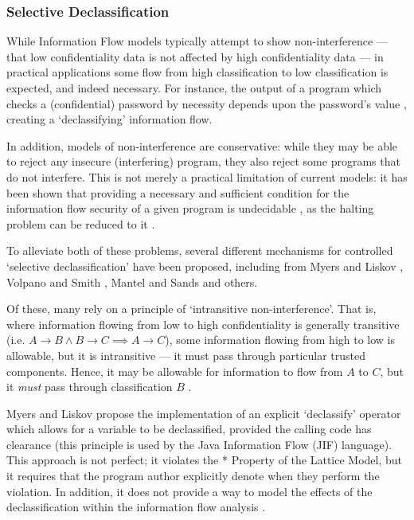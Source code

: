 \subsubsection{Selective Declassification}

While Information Flow models typically attempt to show non-interference --- that low confidentiality data is not affected by high confidentiality data --- in practical applications some flow from high classification to low classification is expected, and indeed necessary. For instance, the output of a program which checks a (confidential) password by necessity depends upon the password's value \cite{sabelfeld2003if}, creating a `declassifying' information flow.

In addition, models of non-interference are conservative: while they may be able to reject any insecure (interfering) program, they also reject some programs that do not interfere. This is not merely a practical limitation of current models: it has been shown that providing a necessary and sufficient condition for the information flow security of a given program is undecidable \cite{landi1992undecidability}, as the halting problem can be reduced to it \cite{denning1977if}.

To alleviate both of these problems, several different mechanisms for controlled `selective declassification' have been proposed, including from Myers and Liskov \cite{myers1997if}, Volpano and Smith \cite{volpano2000declassification}, Mantel and Sands \cite{mantel2004controlled} and others.

Of these, many rely on a principle of `intransitive non-interference'. That is, where information flowing from low to high confidentiality is generally transitive (i.e. $ A \rightarrow B \wedge B \rightarrow C \implies A \rightarrow C $), some information flowing from high to low is allowable, but it is intransitive --- it must pass through particular trusted components. Hence, it may be allowable for information to flow from $ A $ to $ C $, but it \textit{must} pass through classification $ B $ \cite{roscoe1999intransitive}.

Myers and Liskov \cite{myers1997if} propose the implementation of an explicit `declassify' operator which allows for a variable to be declassified, provided the calling code has clearance (this principle is used by the Java Information Flow (JIF) language). This approach is not perfect; it violates the * Property of the Lattice Model, but it requires that the program author explicitly denote when they perform the violation. In addition, it does not provide a way to model the effects of the declassification within the information flow analysis  \cite{zdancewic2004challenges}.

